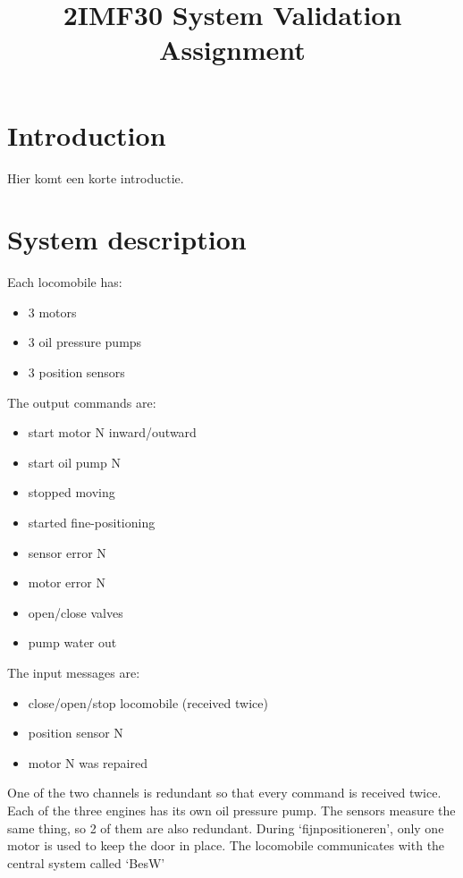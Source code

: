 \documentclass{article}
\title{2IMF30 System Validation Assignment}
\begin{document}
\section{Introduction}
Hier komt een korte introductie.

\section{System description}
Each locomobile has:
\begin{itemize}
    \item 3 motors
    \item 3 oil pressure pumps
    \item 3 position sensors
\end{itemize}
The output commands are:
\begin{itemize}
    \item start motor N inward/outward
    \item start oil pump N

    \item stopped moving
    \item started fine-positioning
    \item sensor error N
    \item motor error N

    \item open/close valves
    \item pump water out
\end{itemize}
The input messages are:
\begin{itemize}
    \item close/open/stop locomobile (received twice)
    \item position sensor N
    \item motor N was repaired
\end{itemize}

One of the two channels is redundant so that every command is received twice. Each of the three engines has its own oil pressure pump. The sensors measure the same thing, so 2 of them are also redundant. During `fijnpositioneren', only one motor is used to keep the door in place. The locomobile communicates with the central system called `BesW'
\end{document}
